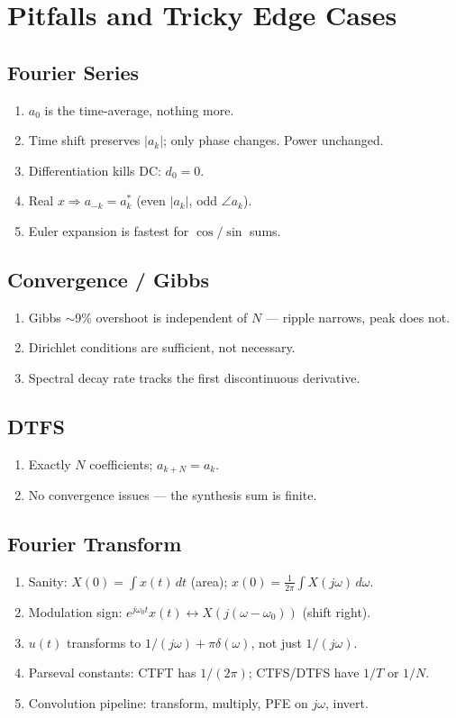 \documentclass[11pt]{article}
\begin{document}
\section{Pitfalls and Tricky Edge Cases}

\subsection{Fourier Series}
\begin{enumerate}[leftmargin=*]
  \item $a_0$ is the time-average, nothing more.
  \item Time shift preserves $|a_k|$; only phase changes. Power unchanged.
  \item Differentiation kills DC: $d_0 = 0$.
  \item Real $x\Rightarrow a_{-k}=a_k^*$ (even $|a_k|$, odd $\angle a_k$).
  \item Euler expansion is fastest for $\cos/\sin$ sums.
\end{enumerate}

\subsection{Convergence / Gibbs}
\begin{enumerate}[resume,leftmargin=*]
  \item Gibbs $\sim$9\% overshoot is independent of $N$ --- ripple narrows, peak does not.
  \item Dirichlet conditions are sufficient, not necessary.
  \item Spectral decay rate tracks the first discontinuous derivative.
\end{enumerate}

\subsection{DTFS}
\begin{enumerate}[resume,leftmargin=*]
  \item Exactly $N$ coefficients; $a_{k+N}=a_k$.
  \item No convergence issues --- the synthesis sum is finite.
\end{enumerate}

\subsection{Fourier Transform}
\begin{enumerate}[resume,leftmargin=*]
  \item Sanity: $X(0) = \int x(t)\,dt$ (area); $x(0)=\frac{1}{2\pi}\int X(j\omega)\,d\omega$.
  \item Modulation sign: $e^{j\omega_0 t}x(t)\leftrightarrow X(j(\omega-\omega_0))$ (shift right).
  \item $u(t)$ transforms to $1/(j\omega)+\pi\delta(\omega)$, not just $1/(j\omega)$.
  \item Parseval constants: CTFT has $1/(2\pi)$; CTFS/DTFS have $1/T$ or $1/N$.
  \item Convolution pipeline: transform, multiply, PFE on $j\omega$, invert.
\end{enumerate}
\end{document}
